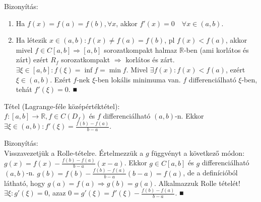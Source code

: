 \documentclass[12pt,a4paper]{scrartcl}
\providecommand{\tightlist}{%
  \setlength{\itemsep}{0pt}\setlength{\parskip}{0pt}}
\newenvironment{tetel}{}{}
\newenvironment{bizonyitas}{}{}
\begin{document}
\begin{bizonyitas}

Bizonyítás:

\begin{enumerate}
\def\labelenumi{\arabic{enumi}.}
\tightlist
\item
  Ha
  \(f\left( x \right) = f\left( a \right) = f\left( b \right),\forall x\),
  akkor
  \(f'\left( x \right) = 0\quad\forall x \in \left( {a,b} \right)\).
\item
  Ha létezik
  \(x \in \left( {a,b} \right):f\left( x \right) \neq f\left( a \right) = f\left( b \right)\),
  pl \(f\left( x \right) < f\left( a \right)\), akkor mivel
  \(\left. f \in C\left\lbrack {a,b} \right\rbrack\Rightarrow\left\lbrack {a,b} \right\rbrack \right.\)
  sorozatkompakt halmaz \(\mathbb{R}\)-ben (ami korlátos és zárt) ezért
  \(R_{f}\) sorozatkompakt \(\Rightarrow\) korlátos és zárt.
  \(\exists\xi \in \left\lbrack {a,b} \right\rbrack:f\left( \xi \right) = \inf f = \min f\).
  Mivel
  \(\exists f\left( x \right):f\left( x \right) < f\left( a \right)\),
  ezért \(\xi \in \left( {a,b} \right)\). Ezért \(f\)-nek \(\xi\)-ben
  lokális minimuma van. \(f\) differenciálható \(\xi\)-ben, tehát
  \(f'\left( \xi \right) = 0\). ■
\end{enumerate}

\end{bizonyitas}

\begin{tetel}

Tétel (Lagrange-féle középértéktétel):\\
\(\left. f:\left\lbrack {a,b} \right\rbrack\rightarrow{\mathbb{R}},f \in C\left( D_{f} \right) \right.\)
és \(f\) differenciálható \(\left( {a,b} \right)\)-n. Ekkor
\(\exists\xi \in \left( {a,b} \right):f'\left( \xi \right) = \frac{f\left( b \right) - f\left( a \right)}{b - a}\).

\end{tetel}

\begin{bizonyitas}

Bizonyítás:\\
Visszavezetjük a Rolle-tételre. Értelmezzük a \(g\) függvényt a
következő módon:
\(g\left( x \right) = f\left( x \right) - \frac{f\left( b \right) - f\left( a \right)}{b - a}\left( {x - a} \right)\).
Ekkor \(g \in C\left\lbrack {a,b} \right\rbrack\) és \(g\)
differenciálható \(\left( {a,b} \right)\)-n.
\(g\left( b \right) = f\left( b \right) - \frac{f\left( b \right) - f\left( a \right)}{b - a}\left( {b - a} \right) = f\left( a \right)\),
de a definícióból látható, hogy
\(\left. g\left( a \right) = f\left( a \right)\Rightarrow g\left( b \right) = g\left( a \right) \right.\).
Alkalmazzuk Rolle tételét! \(\exists\xi:g'\left( \xi \right) = 0\), azaz
\(0 = g'\left( \xi \right) = f'\left( \xi \right) - \frac{f\left( b \right) - f\left( a \right)}{b - a}\).
■

\end{bizonyitas}
\end{document}

